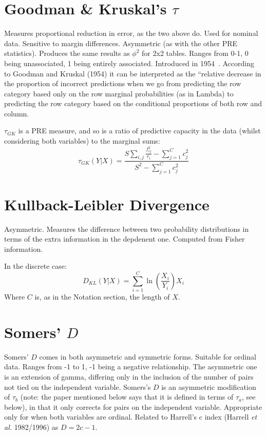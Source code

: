 \documentclass[11pt]{article}
\begin{document}
\section{Goodman \& Kruskal's $\tau$}
Measures proportional reduction in error, as the two above do.  Used for nominal data. Sensitive to margin differences.  Asymmetric (as with the other PRE statistics).  Produces the same results as $\phi^2$ for 2x2 tables.  Ranges from 0-1, 0 being unassociated, 1 being entirely associated.  Introduced in 1954~\cite{goodman1954measures}.
According to Goodman and Kruskal (1954) it can be interpreted as the ``relative decrease in the proportion of incorrect predictions when we go from predicting the row category based only on the row marginal probabilities (as in Lambda) to predicting the row category based on the conditional proportions of both row and column.  

$\tau_{GK}$ is a PRE measure, and so is a ratio of predictive capacity in the data (whilst considering both variables) to the marginal sums:
$$
\tau_{GK}(Y|X) = \frac{   S \sum_{i, j}{ \frac{ f_{ij}^2 }{ r_i } } - \sum_{j=1}^{C}{ c_j^2 }    }{   S^2 - \sum_{j=1}^{C}{ c_j^2 }    }
$$





\section{Kullback-Leibler Divergence}
Asymmetric.  Measures the difference between two probability distributions in terms of the extra information in the depdenent one.  Computed from Fisher information.  

In the discrete case:
$$
D_{KL}(Y|X) = \sum_{i=1}^{C}{ \ln \left( \frac{X_i}{Y_i} \right) } X_i
$$
Where $C$ is, as in the Notation section, the length of $X$.



\section{Somers' $D$}
Somers' $D$ comes in both asymmetric and symmetric forms.  Suitable for ordinal data.  Ranges from -1 to 1, -1 being a negative relationship.  The asymmetric one is an extension of gamma, differing only in the inclusion of the number of pairs not tied on the independent variable.  Somers's $D$ is an asymmetric modification of $\tau_b$ (note: the paper mentioned below says that it is defined in terms of $\tau_a$, see below), in that it only corrects for pairs on the independent variable.  Appropriate only for when both variables are ordinal.  Related to Harrell's c index (Harrell \textsl{et al.} 1982/1996) as $D = 2c - 1$.
\end{document}
